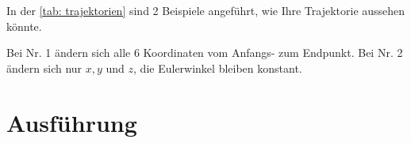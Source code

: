 \documentclass[./\jobname.tex]{subfiles}
\begin{document}
%
In der \autoref{tab: trajektorien} sind 2 Beispiele angeführt, wie Ihre Trajektorie aussehen könnte.\par
Bei Nr. 1 ändern sich alle 6 Koordinaten vom Anfangs- zum Endpunkt.
Bei Nr. 2 ändern sich nur \(x,y\) und \(z\), die Eulerwinkel bleiben konstant.
%
\begin{table}[H]
	\centering
	\noindent{}
	\caption{Trajektorien}
	\label{tab: trajektorien}
\end{table}
%
\chapter{Ausführung}
%
\end{document}
